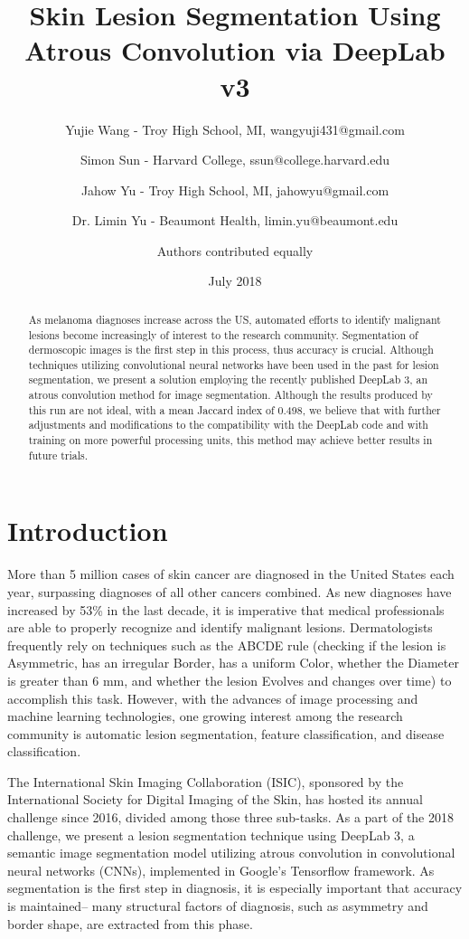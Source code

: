 \documentclass[11pt, letterpaper]{article}
\title{Skin Lesion Segmentation Using Atrous Convolution via DeepLab v3}
\author{Yujie Wang - Troy High School, MI, wangyuji431@gmail.com \and Simon Sun - Harvard College, ssun@college.harvard.edu \and Jahow Yu - Troy High School, MI, jahowyu@gmail.com \and Dr. Limin Yu - Beaumont Health, limin.yu@beaumont.edu \and  Authors contributed equally}
\date{July 2018}
\begin{document}
 
\maketitle
 
\begin{abstract}
	As melanoma diagnoses increase across the US, automated efforts to identify malignant lesions become increasingly of interest to the research community. Segmentation of dermoscopic images is the first step in this process, thus accuracy is crucial. Although techniques utilizing convolutional neural networks have been used in the past for lesion segmentation, we present a solution employing the recently published DeepLab 3, an atrous convolution method for image segmentation. Although the results produced by this run are not ideal, with a mean Jaccard index of 0.498, we believe that with further adjustments and modifications to the compatibility with the DeepLab code and with training on more powerful processing units, this method may achieve better results in future trials.
\end{abstract}

\section{Introduction}
	More than 5 million cases of skin cancer are diagnosed in the United States each year, surpassing diagnoses of all other cancers combined. As new diagnoses have increased by 53\% in the last decade, it is imperative that medical professionals are able to properly recognize and identify malignant lesions. Dermatologists frequently rely on techniques such as the ABCDE rule (checking if the lesion is Asymmetric, has an irregular Border, has a uniform Color, whether the Diameter is greater than 6 mm, and whether the lesion Evolves and changes over time) to accomplish this task. However, with the advances of image processing and machine learning technologies, one growing interest among the research community is automatic lesion segmentation, feature classification, and disease classification. 
	
The International Skin Imaging Collaboration (ISIC), sponsored by the International Society for Digital Imaging of the Skin, has hosted its annual challenge since 2016, divided among those three sub-tasks. As a part of the 2018 challenge, we present a lesion segmentation technique using DeepLab 3, a semantic image segmentation model utilizing atrous convolution in convolutional neural networks (CNNs), implemented in Google’s Tensorflow framework. As segmentation is the first step in diagnosis, it is especially important that accuracy is maintained-- many structural factors of diagnosis, such as asymmetry and border shape, are extracted from this phase. 
\end{document}
